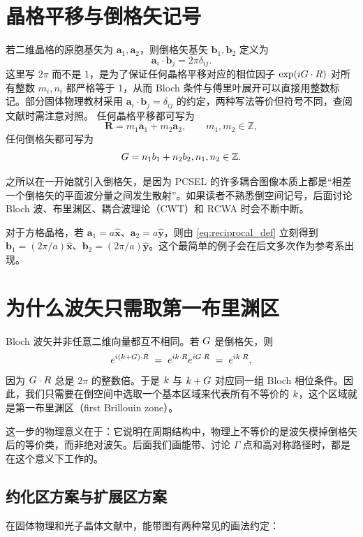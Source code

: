 \section{晶格平移与倒格矢记号}
若二维晶格的原胞基矢为 $\bm{a}_1,\bm{a}_2$，则倒格矢基矢 $\bm{b}_1,\bm{b}_2$ 定义为
\begin{equation}
\bm{a}_i\cdot\bm{b}_j=2\pi\delta_{ij}.
\label{eq:reciprocal_def}
\end{equation}
这里写 $2\pi$ 而不是 $1$，是为了保证任何晶格平移对应的相位因子 $\exp(iG\cdot R)$ 对所有整数 $m_i,n_i$ 都严格等于 1，从而 Bloch 条件与傅里叶展开可以直接用整数标记。部分固体物理教材采用 $\bm{a}_i\cdot\bm{b}_j=\delta_{ij}$ 的约定，两种写法等价但符号不同，查阅文献时需注意对照。
任何晶格平移都可写为
\[
\bm{R}=m_1\bm{a}_1+m_2\bm{a}_2,\qquad m_1,m_2\in\mathbb{Z},
\]
任何倒格矢都可写为
\[
G=n_1b_1+n_2b_2, n_1,n_2\in\mathbb{Z}.
\]

之所以在一开始就引入倒格矢，是因为 PCSEL 的许多耦合图像本质上都是“相差一个倒格矢的平面波分量之间发生散射”。如果读者不熟悉倒空间记号，后面讨论 Bloch 波、布里渊区、耦合波理论（CWT）和 RCWA 时会不断中断。

对于方格晶格，若 $\bm{a}_1=a\hat{\bm{x}}$、$\bm{a}_2=a\hat{\bm{y}}$，则由 \cref{eq:reciprocal_def} 立刻得到 $\bm{b}_1=(2\pi/a)\hat{\bm{x}}$、$\bm{b}_2=(2\pi/a)\hat{\bm{y}}$。这个最简单的例子会在后文多次作为参考系出现。


\section{为什么波矢只需取第一布里渊区}
Bloch 波矢并非任意二维向量都互不相同。若 $G$ 是倒格矢，则
\[
e^{i(k+G)\cdot R}
\;=\;
e^{ik\cdot R}e^{iG\cdot R}
\;=\;
e^{ik\cdot R},
\]
因为 $G\cdot R$ 总是 $2\pi$ 的整数倍。于是 $k$ 与 $k+G$ 对应同一组 Bloch 相位条件。因此，我们只需要在倒空间中选取一个基本区域来代表所有不等价的 $k$，这个区域就是第一布里渊区（first Brillouin zone）。

这一步的物理意义在于：它说明在周期结构中，物理上不等价的是波矢模掉倒格矢后的等价类，而非绝对波矢。后面我们画能带、讨论 $\Gamma$ 点和高对称路径时，都是在这个意义下工作的。

\subsection{约化区方案与扩展区方案}
在固体物理和光子晶体文献中，能带图有两种常见的画法约定：

